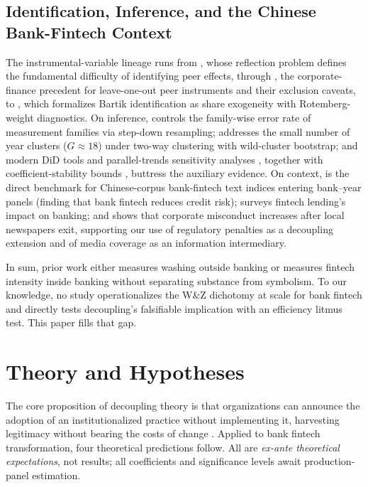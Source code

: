 \subsection{Identification, Inference, and the Chinese Bank-Fintech Context}

The instrumental-variable lineage runs from \textcite{manski1993reflection},
whose reflection problem defines the fundamental difficulty of identifying
peer effects, through \textcite{learyroberts2014peer}, the corporate-finance
precedent for leave-one-out peer instruments and their exclusion caveats, to
\textcite{goldsmithpinkham2020bartik}, which formalizes Bartik identification
as share exogeneity with Rotemberg-weight diagnostics. On inference,
\textcite{romanowolf2005stepwise} controls the family-wise error rate of
measurement families via step-down resampling;
\textcite{roodman2019boottest} addresses the small number of year clusters
($G\approx18$) under two-way clustering with wild-cluster bootstrap; and
modern DiD tools and parallel-trends sensitivity analyses
\parencite{callaway2021difference,rambachan2023more}, together with
coefficient-stability bounds \parencite{oster2019unobservable}, buttress the
auxiliary evidence. On context, \textcite{chengqu2020fintech} is the direct
benchmark for Chinese-corpus bank-fintech text indices entering bank--year
panels (finding that bank fintech reduces credit risk);
\textcite{berg2022fintechlending} surveys fintech lending's impact on
banking; and \textcite{heese2022newspaper} shows that corporate misconduct
increases after local newspapers exit, supporting our use of regulatory
penalties as a decoupling extension and of media coverage as an information
intermediary.

In sum, prior work either measures washing outside banking or measures
fintech intensity inside banking without separating substance from symbolism.
To our knowledge, no study operationalizes the W\&Z dichotomy at scale for
bank fintech and directly tests decoupling's falsifiable implication with an
efficiency litmus test. This paper fills that gap.

\section{Theory and Hypotheses}\label{sec:theory}

The core proposition of decoupling theory is that organizations can announce
the adoption of an institutionalized practice without implementing it,
harvesting legitimacy without bearing the costs of change
\parencite{westphal1998sym,westphal2001decoupling}. Applied to bank fintech
transformation, four theoretical predictions follow. All are \emph{ex-ante
theoretical expectations}, not results; all coefficients and significance
levels await production-panel estimation.

